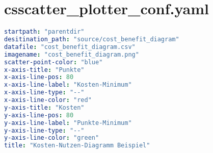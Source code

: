 
\section{csscatter\_plotter\_conf.yaml}
\lstset{style=gra_codestyle}
\begin{lstlisting}[language=yaml, caption=Python LaTex - csscatter\_plotter\_conf.yaml - Konfigurationsdatei - Kosten-Nutzen-Diagramm,captionpos=b,label={lst:scatter_plotter_conf},breaklines=true]
startpath: "parentdir"
desitination_path: "source/cost_benefit_diagram"
datafile: "cost_benefit_diagram.csv"
imagename: "cost_benefit_diagram.png"
scatter-point-color: "blue"
x-axis-title: "Punkte"
x-axis-line-pos: 80
x-axis-line-label: "Kosten-Minimum"
x-axis-line-type: "--"
x-axis-line-color: "red"
y-axis-title: "Kosten"
y-axis-line-pos: 80
y-axis-line-label: "Punkte-Minimum"
y-axis-line-type: "--"
y-axis-line-color: "green"
title: "Kosten-Nutzen-Diagramm Beispiel"
\end{lstlisting}